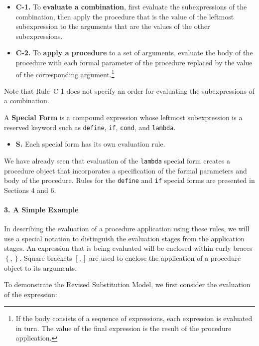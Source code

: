 \begin{itemize} 

\item{\bf C-1.} To {\bf evaluate a combination}, first evaluate the
subexpressions of the combination, then apply the procedure that is
the value of the leftmost subexpression to the arguments that are the
values of the other subexpressions.

\item{\bf C-2.}  To {\bf apply a procedure} to a set of arguments,
evaluate the body of the procedure with each formal parameter of the
procedure replaced by the value of the corresponding 
argument.\footnote{If the body consists of a sequence of expressions,
each expression is evaluated in turn. The value of the final
expression is the result of the procedure application.}
\end{itemize} 

Note that Rule~C-1 does not specify an order for evaluating the
subexpressions of a combination.

\noindent A {\bf Special Form} is a compound expression
whose leftmost subexpression is a reserved keyword
such as {\tt define}, {\tt if}, {\tt cond}, and {\tt lambda}.

\begin{itemize} 
\item {\bf S.} Each special form has its own evaluation rule.
\end{itemize} 

We have already seen that evaluation of the {\tt lambda} special form
creates a procedure object that incorporates a specification of the
formal parameters and body of the procedure. 
Rules for the {\tt define} and {\tt if} special forms are presented 
in Sections 4 and 6.

\paragraph{3. A Simple Example}

In describing the evaluation of a procedure application using these
rules, we will use a special notation to distinguish the evaluation
stages from the application stages. An expression that is being
evaluated will be enclosed within curly braces $\left\{, \right\}$.
Square brackets $\left[, \right]$ are used to enclose the application
of a procedure object to its arguments.

To demonstrate the Revised Substitution Model, we first consider the
evaluation of the expression:

